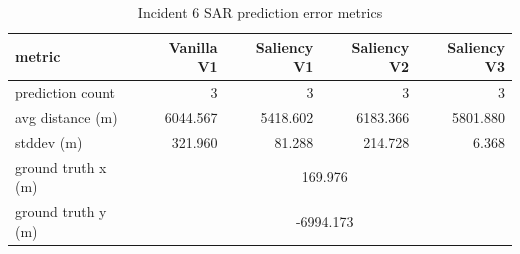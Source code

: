 \begin{table}[ht]
\centering
\caption{Incident 6 SAR prediction error metrics}
\label{tab:sar-incident-6}
\begin{tabular}{lrrrr}
\hline
metric & Vanilla V1 & Saliency V1 & Saliency V2 & Saliency V3 \\
\hline
prediction count & 3 & 3 & 3 & 3 \\
avg distance (m) & 6044.567 & 5418.602 & 6183.366 & 5801.880 \\
stddev (m) & 321.960 & 81.288 & 214.728 & 6.368 \\
ground truth x (m) & \multicolumn{4}{c}{169.976} \\
ground truth y (m) & \multicolumn{4}{c}{-6994.173} \\
\hline
\end{tabular}
\end{table}
